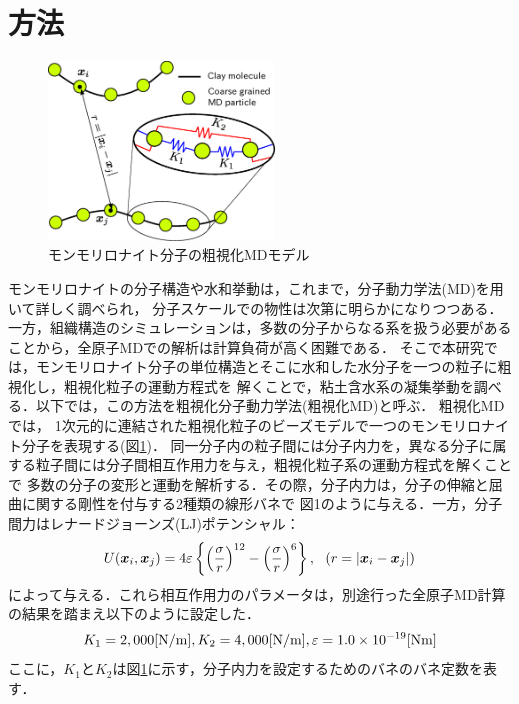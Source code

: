 ﻿\documentclass[11pt,a4j]{jarticle}
\begin{document}
\section{方法}
\begin{figure}
	\centering
	\includegraphics[keepaspectratio,width=60mm]{Figs/cg_model.eps}
	\caption{モンモリロナイト分子の粗視化MDモデル}
	\label{fig:fig1}
\end{figure}
モンモリロナイトの分子構造や水和挙動は，これまで，分子動力学法(MD)を用いて詳しく調べられ，
分子スケールでの物性は次第に明らかになりつつある\cite{Kawamura}．
一方，組織構造のシミュレーションは，多数の分子からなる系を扱う必要があることから，全原子MDでの解析は計算負荷が高く困難である．
そこで本研究では，モンモリロナイト分子の単位構造とそこに水和した水分子を一つの粒子に粗視化し，粗視化粒子の運動方程式を
解くことで，粘土含水系の凝集挙動を調べる．以下では，この方法を粗視化分子動力学法(粗視化MD)と呼ぶ．
粗視化MDでは， 1次元的に連結された粗視化粒子のビーズモデルで一つのモンモリロナイト分子を表現する(図\ref{fig:fig1})．
同一分子内の粒子間には分子内力を，異なる分子に属する粒子間には分子間相互作用力を与え，粗視化粒子系の運動方程式を解くことで
多数の分子の変形と運動を解析する．その際，分子内力は，分子の伸縮と屈曲に関する剛性を付与する2種類の線形バネで
図1のように与える．一方，分子間力はレナードジョーンズ(LJ)ポテンシャル：
\begin{equation}
	U(\mbox{\boldmath $x$}_i,\mbox{\boldmath $x$}_j)=4\varepsilon
	\left\{ \left(\frac{\sigma}{r}\right)^{12}-
	\left( \frac{\sigma}{r}\right)^6\right\}, 
	\ \ \left(r=\left| \mbox{\boldmath $x$}_i-\mbox{\boldmath $x$}_j\right|\right)
	\label{eqn:LJ}
\end{equation}
によって与える．これら相互作用力のパラメータは，別途行った全原子MD計算の結果を踏まえ以下のように設定した．
\begin{equation}
	K_1  = 2,000[{\rm N / m}],   K_2  = 4,000[{\rm N / m}],  \varepsilon = 1.0\times10^{-19}     [{\rm Nm}]
	\label{eqn:prms}
\end{equation}
ここに，$K_1$と$K_2$は図\ref{fig:fig1}に示す，分子内力を設定するためのバネのバネ定数を表す．
\end{document}
